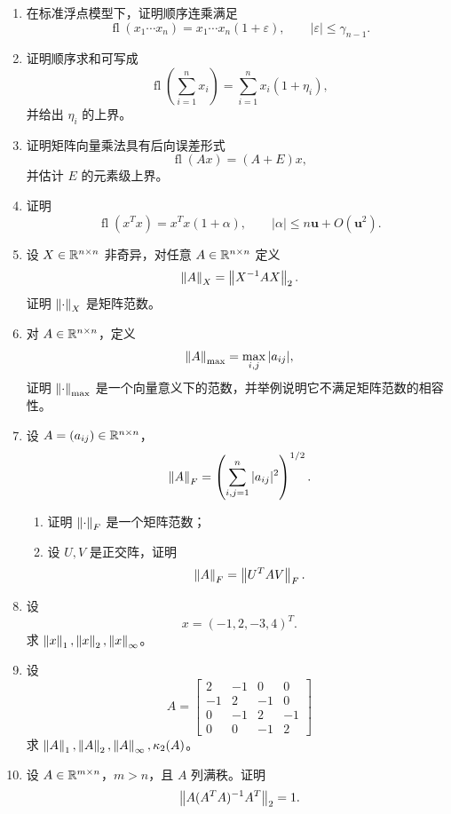 \documentclass{article}
\newcommand{\fl}{\operatorname{fl}}
\begin{document}
\begin{enumerate}
  \item 在标准浮点模型下，证明顺序连乘满足
  \[
    \fl(x_1\cdots x_n)=x_1\cdots x_n(1+\varepsilon),\qquad
    |\varepsilon|\le\gamma_{n-1}.
  \]

  \item 证明顺序求和可写成
  \[
    \fl\left(\sum_{i=1}^n x_i\right)=\sum_{i=1}^n x_i(1+\eta_i),
  \]
  并给出 $\eta_i$ 的上界。

  \item 证明矩阵向量乘法具有后向误差形式
  \[
    \fl(Ax)=(A+E)x,
  \]
  并估计 $E$ 的元素级上界。

  \item 证明
  \[
    \fl(x^Tx)=x^Tx(1+\alpha),\qquad |\alpha|\le n\mathbf u+O(\mathbf u^2).
  \]

  \item 设 $X\in\mathbb{R}^{n\times n}$ 非奇异，对任意 $A\in\mathbb{R}^{n\times n}$ 定义
  \[
    \left\| A \right\|_X=\left\| X^{-1}AX \right\|_2.
  \]
  证明 $\left\| \cdot \right\|_X$ 是矩阵范数。

  \item 对 $A\in\mathbb{R}^{n\times n}$，定义
  \[
    \left\| A \right\|_{\max}=\max_{i,j}|a_{ij}|,
  \]
  证明 $\left\| \cdot \right\|_{\max}$ 是一个向量意义下的范数，并举例说明它不满足矩阵范数的相容性。

  \item 设 $A=(a_{ij})\in\mathbb{R}^{n\times n}$，
  \[
    \left\| A \right\|_F=\left(\sum_{i,j=1}^n |a_{ij}|^2\right)^{1/2}.
  \]
  \begin{enumerate}[(1)]
    \item 证明 $\left\| \cdot \right\|_F$ 是一个矩阵范数；
    \item 设 $U,V$ 是正交阵，证明
    \[
      \left\| A \right\|_F=\left\| U^TAV \right\|_F.
    \]
  \end{enumerate}

  \item 设
  \[
    x=(-1,2,-3,4)^T.
  \]
  求 $\left\| x \right\|_1,\left\| x \right\|_2,\left\| x \right\|_\infty$。

  \item 设
  \[
    A=\begin{bmatrix}
      2&-1&0&0\\
      -1&2&-1&0\\
      0&-1&2&-1\\
      0&0&-1&2
    \end{bmatrix}
  \]
  求 $\left\| A \right\|_1,\left\| A \right\|_2,\left\| A \right\|_\infty,\kappa_2(A)$。

  \item 设 $A\in\mathbb{R}^{m\times n}$，$m>n$，且 $A$ 列满秩。证明
  \[
    \left\| A(A^TA)^{-1}A^T \right\|_2=1.
  \]
\end{enumerate}
\end{document}
